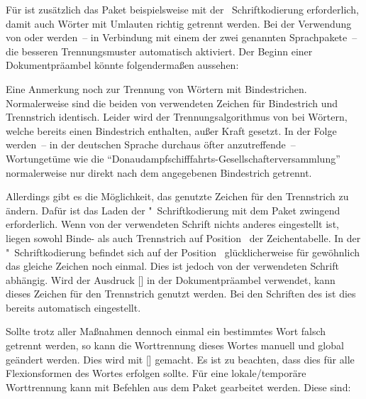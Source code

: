Für  ist zusätzlich das Paket  beispielsweise 
mit der ~Schriftkodierung erforderlich, damit auch Wörter mit 
Umlauten richtig getrennt werden. Bei der Verwendung von  
oder  werden~-- in Verbindung mit einem der zwei genannten 
Sprachpakete~-- die besseren Trennungsmuster automatisch aktiviert. Der Beginn 
einer Dokumentpräambel könnte folgendermaßen aussehen:
%
\begin{quoting}[rightmargin=0pt]
\end{quoting}
%
Eine Anmerkung noch zur Trennung von Wörtern mit Bindestrichen. Normalerweise 
sind die beiden von  verwendeten Zeichen für Bindestrich und 
Trennstrich identisch. Leider wird der Trennungsalgorithmus von  
bei Wörtern, welche bereits einen Bindestrich enthalten, außer Kraft gesetzt. 
In der Folge werden~-- in der deutschen Sprache durchaus öfter anzutreffende~-- 
Wortungetüme wie die \enquote{Donaudampfschifffahrts-Gesellschafterversammlung} 
normalerweise nur direkt nach dem angegebenen Bindestrich getrennt. 

Allerdings gibt es die Möglichkeit, das genutzte Zeichen für den Trennstrich 
zu ändern. Dafür ist das Laden der "~Schriftkodierung mit dem Paket 
 zwingend erforderlich. Wenn von der verwendeten Schrift 
nichts anderes eingestellt ist, liegen sowohl Binde- als auch Trennstrich auf 
Position~ der Zeichentabelle. In der "~Schriftkodierung 
befindet sich auf der Position~ glücklicherweise für gewöhnlich das 
gleiche Zeichen noch einmal. Dies ist jedoch von der verwendeten Schrift 
abhängig. Wird der Ausdruck [] in der 
Dokumentpräambel verwendet, kann dieses Zeichen für den Trennstrich genutzt 
werden. Bei den Schriften des \TUDCDs ist dies bereits automatisch eingestellt.

Sollte trotz aller Maßnahmen dennoch einmal ein bestimmtes Wort falsch getrennt 
werden, so kann die Worttrennung dieses Wortes manuell und global geändert 
werden. Dies wird mit [] 
gemacht. Es ist zu beachten, dass dies für alle Flexionsformen des Wortes 
erfolgen sollte. Für eine lokale/temporäre Worttrennung kann mit Befehlen aus 
dem Paket  gearbeitet werden. Diese sind: 

